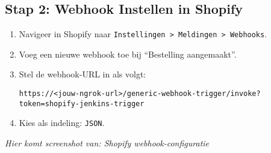 \subsection{Stap 2: Webhook Instellen in Shopify}
\begin{enumerate}
    \item Navigeer in Shopify naar \texttt{Instellingen > Meldingen > Webhooks}.
    \item Voeg een nieuwe webhook toe bij ``Bestelling aangemaakt''.
    \item Stel de webhook-URL in als volgt:
    \begin{lstlisting}[language=text]
        https://<jouw-ngrok-url>/generic-webhook-trigger/invoke?token=shopify-jenkins-trigger
    \end{lstlisting}
    \item Kies als indeling: \texttt{JSON}.
\end{enumerate}

\vspace{0.5em}
\textit{Hier komt screenshot van: Shopify webhook-configuratie}

